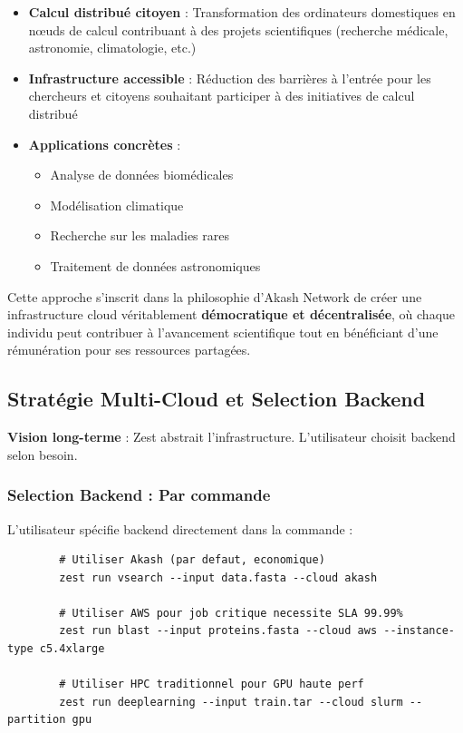 \documentclass[11pt,a4paper]{article}
\begin{document}
\begin{itemize}
	\item \textbf{Calcul distribué citoyen} : Transformation des ordinateurs domestiques en nœuds de calcul contribuant à des projets scientifiques (recherche médicale, astronomie, climatologie, etc.)
	
	\item \textbf{Infrastructure accessible} : Réduction des barrières à l'entrée pour les chercheurs et citoyens souhaitant participer à des initiatives de calcul distribué
	
	\item \textbf{Applications concrètes} :
	\begin{itemize}
		\item Analyse de données biomédicales
		\item Modélisation climatique
		\item Recherche sur les maladies rares
		\item Traitement de données astronomiques
	\end{itemize}
	
\end{itemize}

Cette approche s'inscrit dans la philosophie d'Akash Network de créer une infrastructure cloud véritablement \textbf{démocratique et décentralisée}, où chaque individu peut contribuer à l'avancement scientifique tout en bénéficiant d'une rémunération pour ses ressources partagées.

	
	\newpage
	
	\subsection{Stratégie Multi-Cloud et Selection Backend}
	
	\textbf{Vision long-terme} : Zest abstrait l'infrastructure. L'utilisateur choisit backend selon besoin.
	
	\subsubsection{Selection Backend : Par commande}
	
	L'utilisateur spécifie backend directement dans la commande :
	
	\begin{lstlisting}
		# Utiliser Akash (par defaut, economique)
		zest run vsearch --input data.fasta --cloud akash
		
		# Utiliser AWS pour job critique necessite SLA 99.99%
		zest run blast --input proteins.fasta --cloud aws --instance-type c5.4xlarge
		
		# Utiliser HPC traditionnel pour GPU haute perf
		zest run deeplearning --input train.tar --cloud slurm --partition gpu
	\end{lstlisting}
	
\end{document}
